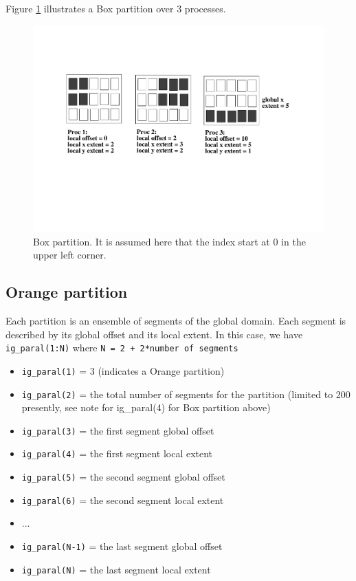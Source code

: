 Figure \ref{box_partition} illustrates a Box partition over 3
processes.  
 
\begin{figure}
\includegraphics[scale=.6]{figures/box_new} 
\caption{Box partition. It is assumed here that the index start at 0 in the upper left corner.}
\label{box_partition}
\end{figure} 
  
\subsection{Orange partition}

Each partition is an ensemble of segments of the global domain. Each
segment is described by its global offset and its local extent.  In
this case, we have {\tt ig\_paral(1:N)} where {\tt N = 2 + 2*number of
segments}

\begin{itemize}
 \item {\tt ig\_paral(1)} = 3 (indicates a Orange partition)
 \item {\tt ig\_paral(2)} = the total number of segments for the partition (limited to 200 presently, see note for ig\_paral(4) for Box partition above)
 \item {\tt ig\_paral(3)} = the first segment global offset
 \item {\tt ig\_paral(4)} = the first segment local extent
 \item {\tt ig\_paral(5)} = the second segment global offset
 \item {\tt ig\_paral(6)} = the second segment local extent
 \item ...
 \item {\tt ig\_paral(N-1)} = the last segment global offset
 \item {\tt ig\_paral(N)} = the last segment local extent
\end{itemize}

